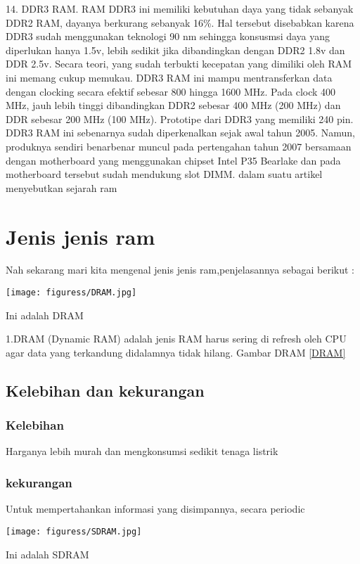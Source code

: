 14. DDR3 RAM. RAM DDR3 ini memiliki kebutuhan daya yang tidak sebanyak DDR2 RAM, dayanya berkurang sebanyak 16\%. Hal tersebut disebabkan karena DDR3 sudah menggunakan teknologi 90 nm sehingga konsusmsi daya yang diperlukan hanya 1.5v, lebih sedikit jika dibandingkan dengan DDR2 1.8v dan DDR 2.5v. Secara teori, yang sudah terbukti kecepatan yang dimiliki oleh RAM ini memang cukup memukau. DDR3 RAM ini mampu mentransferkan data dengan clocking secara efektif sebesar 800 hingga 1600 MHz. Pada clock 400 MHz, jauh lebih tinggi dibandingkan DDR2 sebesar 400 MHz (200 MHz) dan DDR sebesar 200 MHz (100 MHz). Prototipe dari DDR3 yang memiliki 240 pin. DDR3 RAM ini sebenarnya sudah diperkenalkan sejak awal tahun 2005. Namun, produknya sendiri benar\-benar muncul pada pertengahan tahun 2007 bersamaan dengan motherboard yang menggunakan chipset Intel P35 Bearlake dan pada motherboard tersebut sudah mendukung slot DIMM.
dalam suatu artikel menyebutkan sejarah ram \cite{kan1995random}

\section{Jenis \- jenis ram}
Nah sekarang mari kita mengenal jenis \- jenis ram,penjelasannya sebagai berikut :


  \begin{figures}[ht]
  \centerline{\texttt{[image: figuress/DRAM.jpg]}}
  \caption{Ini adalah DRAM}
  \label{DRAM}
  \end{figures}

1.DRAM (Dynamic RAM) adalah jenis RAM harus sering di refresh oleh CPU agar data yang terkandung didalamnya tidak hilang.
  Gambar DRAM \ref{DRAM}
  \subsection{Kelebihan dan kekurangan}
    \subsubsection{Kelebihan}
    \-Harganya lebih murah dan mengkonsumsi sedikit tenaga listrik
    \subsubsection{kekurangan}
    \-Untuk mempertahankan informasi yang disimpannya, secara periodic
    
  \begin{figures}[ht]
  \centerline{\texttt{[image: figuress/SDRAM.jpg]}}
  \caption{Ini adalah SDRAM}
  \label{SDRAM}
  \end{figures}

